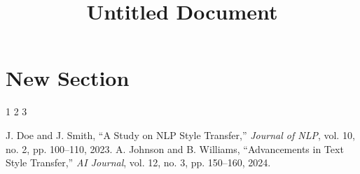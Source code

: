 \documentclass[conference]{IEEEtran}
\title{Untitled Document}
\author{

  \IEEEauthorblockN{Unknown Author}
  \IEEEauthorblockA{No Affiliation \\ No Email}

}
\begin{document}
\maketitle

\begin{abstract}

\end{abstract}












  
    \section{New Section}
    1
2
3

    
  




\begin{thebibliography}{1}

    J. Doe and J. Smith, ``A Study on NLP Style Transfer,'' \emph{Journal of NLP}, vol. 10, no. 2, pp. 100--110, 2023.
    A. Johnson and B. Williams, ``Advancements in Text Style Transfer,'' \emph{AI Journal}, vol. 12, no. 3, pp. 150--160, 2024.

\end{thebibliography}
\end{document}
